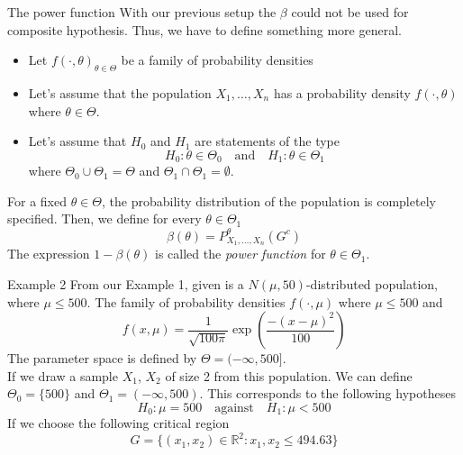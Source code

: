 \documentclass{beamer}
\begin{document}
\begin{frame}{The power function}
	With our previous setup the $\beta$ could not be used for composite hypothesis. Thus, we have to define something more general. 
	\begin{itemize}
		\item Let $f(\cdot, \theta)_{\theta \in \Theta}$ be a family of probability densities 
		\item Let's assume that the population $X_1,\ldots, X_n$  has a probability density $f(\cdot,\theta)$ where $\theta \in \Theta$.  
		\item Let's assume that $H_0$ and $H_1$ are statements of the type
		\begin{equation*}
			H_0 \colon \theta \in \Theta_0 \quad \text{and} \quad H_1\colon \theta \in \Theta_1
		\end{equation*}
	where $\Theta_0 \cup \Theta_1= \Theta$ and $\Theta_1 \cap \Theta_1= \emptyset$.
	
	\end{itemize}
	For a fixed $\theta \in \Theta$, the probability distribution of the population is completely specified. Then, we define for every $\theta \in \Theta_1$
	\begin{equation*}
		\beta(\theta)= P_{X_1,\ldots, X_n}^\theta (G^c)
	\end{equation*}
	The expression $1-\beta(\theta)$ is called the \textit{power function} for $\theta \in \Theta_1$.
\end{frame}

\begin{frame}{Example 2}
	From our Example 1, given is a $N(\mu, 50)$-distributed population, where $\mu \le 500$. 
	The family of probability densities $f(\cdot, \mu)$ where $\mu\le 500$ and 
	\begin{equation*}
		f(x,\mu)= \frac{1}{\sqrt{100 \pi}} \exp\left(\frac{-(x-\mu)^2}{100}\right)
	\end{equation*}
	The parameter space is defined by $\Theta=(-\infty, 500]$. \\
	If we draw a sample $X_1$, $X_2$ of size 2 from this population. We can define $\Theta_0=\{500\}$ and $\Theta_1= (-\infty, 500)$. This corresponds to the following hypotheses
	\begin{equation*}
		H_0 \colon \mu = 500 \quad \text{against} \quad H_1 \colon \mu< 500
	\end{equation*}
If we choose the following critical region 
\begin{equation*}
	G= \{ (x_1,x_2)\in \mathbb{R}^2: x_1, x_2 \le 494.63 \}
\end{equation*}

	
\end{frame}
\end{document}
